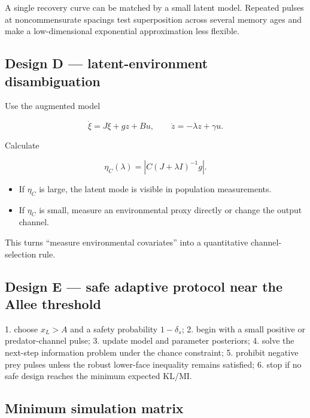 A single recovery curve can be matched by a small latent model. Repeated pulses at noncommensurate spacings test superposition across several memory ages and make a low-dimensional exponential approximation less flexible.

\subsection{Design D --- latent-environment disambiguation}

Use the augmented model

\[
\dot\xi=J\xi+gz+Bu,
\qquad \dot z=-\lambda z+\gamma u.
\]

Calculate

\[
\eta_C(\lambda)=|C(J+\lambda I)^{-1}g|.
\]

\begin{itemize}
\item If \(\eta_C\) is large, the latent mode is visible in population measurements.
\item If \(\eta_C\) is small, measure an environmental proxy directly or change the output channel.
\end{itemize}
This turns ``measure environmental covariates'' into a quantitative channel-selection rule.

\subsection{Design E --- safe adaptive protocol near the Allee threshold}

1. choose \(x_L>A\) and a safety probability \(1-\delta_s\);
2. begin with a small positive or predator-channel pulse;
3. update model and parameter posteriors;
4. solve the next-step information problem under the chance constraint;
5. prohibit negative prey pulses unless the robust lower-face inequality remains satisfied;
6. stop if no safe design reaches the minimum expected KL/MI.

\subsection{Minimum simulation matrix}

